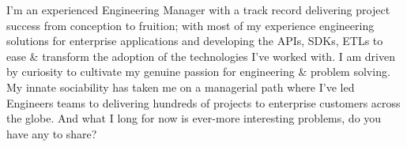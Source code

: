 

\begin{cvparagraph}

I'm an experienced Engineering Manager with a track record delivering project success from conception to fruition; with most of my experience engineering solutions for enterprise applications and developing the APIs, SDKs, ETLs to ease \& transform the adoption of the technologies I've worked with. I am driven by curiosity to cultivate my genuine passion for engineering \& problem solving. My innate sociability has taken me on a managerial path where I've led Engineers teams to delivering hundreds of projects to enterprise customers across the globe. And what I long for now is ever-more interesting problems, do you have any to share?
\end{cvparagraph}